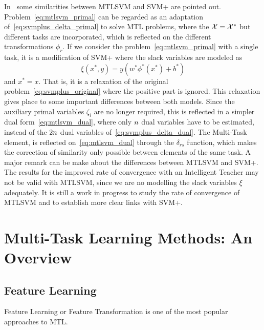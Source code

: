 In~\cite{LiangC08} some similarities between MTLSVM and SVM+ are pointed out. Problem~\eqref{eq:mtlsvm_primal} can be regarded as an adaptation of~\eqref{eq:svmplus_delta_primal} to solve MTL problems, where the $\mathcal{X} = \mathcal{X}^*$ but different tasks are incorporated, which is reflected on the different transformations $\phi_r$.
If we consider the problem~\eqref{eq:mtlsvm_primal} with a single task, it is a modification of SVM+ where the slack variables are modeled as
$$ \xi(x^*, y) = y (w^* \phi^*(x^*) + b^*)  $$
and $x^* = x$. That is, it is a relaxation of the original problem~\eqref{eq:svmplus_original} where the positive part is ignored.
This relaxation gives place to some important differences between both models. Since the auxiliary primal variables $\zeta_i$ are no longer required, this is reflected in a simpler dual form~\eqref{eq:mtlsvm_dual}, where only $n$ dual variables have to be estimated, instead of the $2n$ dual variables of~\eqref{eq:svmplus_delta_dual}.
The Multi-Task element, is reflected on~\eqref{eq:mtlsvm_dual} through the $\delta_{rs}$ function, which makes the correction of similarity only possible between elements of the same task.
%
A major remark can be make about the differences between MTLSVM and SVM+. The results for the improved rate of convergence with an Intelligent Teacher may not be valid with MTLSVM, since we are no modelling the slack variables $\xi$ adequately. 
It is still a work in progress to study the rate of convergence of MTLSVM and to establish more clear links with SVM+.


\section{Multi-Task Learning Methods: An Overview}

\subsection{Feature Learning}
Feature Learning or Feature Transformation is one of the most popular approaches to MTL. 

